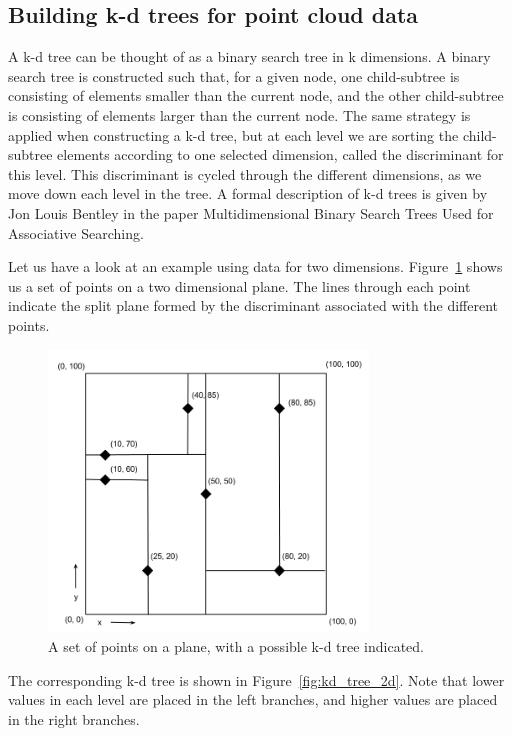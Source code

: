 \subsection{Building k-d trees for point cloud data} %
\label{ssub:building_k_d_trees_for_point_cloud_data}

A k-d tree can be thought of as a binary search tree in k dimensions. A binary search tree is constructed such that, for a given node, one child-subtree is consisting of elements smaller than the current node, and the other child-subtree is consisting of elements larger than the current node. The same strategy is applied when constructing a k-d tree, but at each level we are sorting the child-subtree elements according to one selected dimension, called the discriminant for this level. This discriminant is cycled through the different dimensions, as we move down each level in the tree. A formal description of k-d trees is given by Jon Louis Bentley in the paper Multidimensional Binary Search Trees Used for Associative Searching\cite{Bentley:1975:MBS:361002.361007}.

Let us have a look at an example using data for two dimensions. Figure~\ref{fig:kd_tree_2d_plane} shows us a set of points on a two dimensional plane. The lines through each point indicate the split plane formed by the discriminant associated with the different points.

\begin{figure}[ht!]
    \centering
    \includegraphics[width=85mm]{../gfx/kd_tree_illustration_graph.png}
    \caption{A set of points on a plane, with a possible k-d tree indicated.}
    \label{fig:kd_tree_2d_plane}
\end{figure}

The corresponding k-d tree is shown in Figure~\ref{fig:kd_tree_2d}. Note that lower values in each level are placed in the left branches, and higher values are placed in the right branches.

